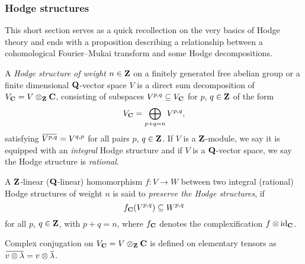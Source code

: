 \subsubsection*{Hodge structures}

This short section serves as a quick recollection on the very basics of Hodge theory and ends with a proposition describing a relationship between a cohomological Fourier--Mukai transform and some Hodge decompositions. 

\begin{definition}
    A \emph{Hodge structure of weight $n \in \mathbf Z$} on a finitely generated free abelian group or a finite dimensional $\mathbf Q$-vector space $V$ is a direct sum decomposition of $V_\mathbf C = V \otimes_\mathbf Z \mathbf C$, consisting of subspaces $V^{p,q} \subseteq V_\mathbf C$ for $p$, $q \in \mathbf Z$ of the form
    \[  
        V_\mathbf C = \bigoplus_{p+q = n} V^{p,q},
    \]
    satisfying $\ols{V^{p,q}} = V^{q,p}$ for all pairs $p$, $q \in \mathbf Z$. If $V$ is a $\mathbf Z$-module, we say it is equipped with an \emph{integral} Hodge structure and if $V$ is a $\mathbf Q$-vector space, we say the Hodge structure is \emph{rational}.
    
    A $\mathbf Z$-linear (\resp $\mathbf Q$-linear) homomorphism $f \colon V \to W$ between two integral (\resp rational) Hodge structures of weight $n$ is said to \emph{preserve the Hodge structures}, if
    \[
        f_\mathbf C(V^{p,q}) \subseteq W^{p,q}
    \]  
    for all $p$, $q \in \mathbf Z$, with $p + q = n$, where $f_\mathbf C$ denotes the complexification $f \otimes \operatorname{id}_{\mathbf C}$.
\end{definition}

\begin{remark}
    Complex conjugation on $V_\mathbf C = V \otimes_\mathbf Z \mathbf C$ is defined on elementary tensors as $\ols{v \otimes \lambda} = v \otimes \ols{\lambda}$.
\end{remark}

